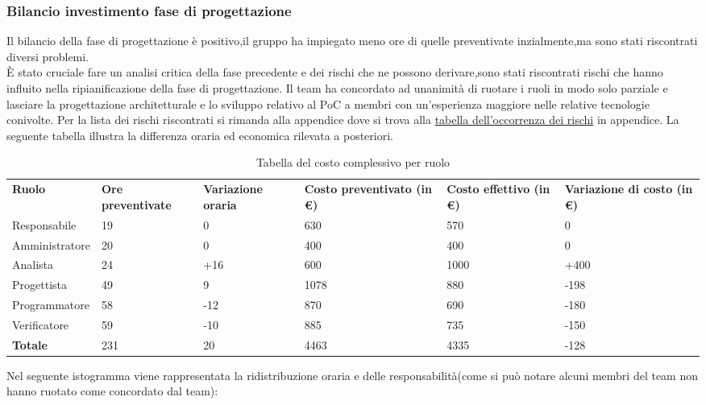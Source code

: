 \subsubsection{Bilancio investimento fase di progettazione}
Il bilancio della fase di progettazione è positivo,il gruppo ha impiegato meno ore di quelle preventivate inzialmente,ma sono stati riscontrati diversi problemi.\\
È stato cruciale fare un analisi critica della fase precedente e dei rischi che ne possono derivare,sono stati riscontrati rischi che hanno influito nella ripianificazione della fase di progettazione.
Il team ha concordato ad unanimità di ruotare i ruoli in modo solo parziale e lasciare la progettazione architetturale e lo sviluppo relativo al PoC a membri con un'esperienza
maggiore nelle relative tecnologie conivolte.
Per la lista dei rischi riscontrati si rimanda alla appendice dove si trova alla \hyperlink{Tabellaoccorrenzarischi}{tabella dell'occorrenza dei rischi} in appendice.
La seguente tabella illustra la differenza oraria ed economica rilevata a posteriori.
{
\renewcommand{\arraystretch}{2}
\begin{longtable}[h]{ C{2.5cm} C{2cm} C{1.8cm} C{2.2cm} C{1.5cm} C{2.3cm}}
\caption{Tabella del costo complessivo per ruolo}\\
\rowcolor{\primaryColor}

\textcolor{\secondaryColor}{\textbf{Ruolo}} & 
\textcolor{\secondaryColor}{\textbf{Ore preventivate}} & 
\textcolor{\secondaryColor}{\textbf{Variazione oraria}} & 
\textcolor{\secondaryColor}{\textbf{Costo preventivato (in \euro{})}} & 
\textcolor{\secondaryColor}{\textbf{Costo effettivo (in \euro{})}} & 
\textcolor{\secondaryColor}{\textbf{Variazione di costo (in \euro{})}}\\	
	
Responsabile    &  19 & 0 & 630 & 570 &  0 \\
Amministratore  &  20 & 0 & 400 & 400 & 0 \\
Analista        & 24 & +16 & 600 & 1000 & +400 \\
Progettista     &  49 & 9 & 1078 & 880 & -198 \\
Programmatore   &   58 & -12 & 870 &  690 & -180 \\
Verificatore    &  59 &  -10 & 885 & 735 & -150 \\
\textbf{Totale} & 231 & 20 & 4463 & 4335 & -128 \\	
\end{longtable}
}
 Nel seguente istogramma viene rappresentata la ridistribuzione oraria e delle responsabilità(come si può notare alcuni membri del team non hanno ruotato come concordato dal team):\\
